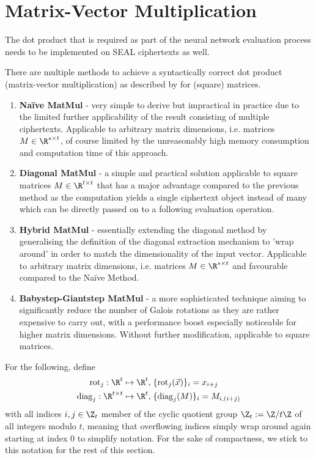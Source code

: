 \section{Matrix-Vector Multiplication}
The dot product that is required as part of the neural network evaluation process
needs to be implemented on SEAL ciphertexts as well.

There are multiple methods to achieve a syntactically correct dot product (matrix-vector multiplication)
as described by \textcite{2018-gazelle} for (square) matrices.

\begin{enumerate}
  \item \textbf{Naïve MatMul} - very simple to derive but impractical in practice due to the limited further
        applicability of the result consisting of multiple ciphertexts. Applicable to arbitrary matrix dimensions,
        i.e. matrices $M \in \R^{s \times t}$, of course limited by the unreasonably high memory consumption
        and computation time of this approach.
  \item \textbf{Diagonal MatMul} - a simple and practical solution applicable to square matrices $M \in \R^{t \times t}$
        that has a major advantage compared to the previous method as the computation yields a
        single ciphertext object instead of many which can be directly passed on to a following evaluation operation.
  \item \textbf{Hybrid MatMul} - essentially extending the diagonal method by generalising the definition of the
        diagonal extraction mechanism to 'wrap around' in order to match the dimensionality of the input vector.
        Applicable to arbitrary matrix dimensions, i.e. matrices $M \in \R^{s \times t}$ and favourable compared
        to the Naïve Method.
  \item \textbf{Babystep-Giantstep MatMul} - a more sophisticated technique aiming to significantly reduce the number of
        Galois rotations as they are rather expensive to carry out,
        with a performance boost especially noticeable for higher matrix dimensions.
        Without further modification, applicable to square matrices.
\end{enumerate}

For the following, define
\newcommand{\rot}{\mathrm{rot}}
\newcommand{\diag}{\mathrm{diag}}
\begin{align}
  \rot_j: \R^t \mapsto \R^t,             & \; \{\rot_j(\vec{x})\}_i = x_{i + j} \label{eq:rot-definition} \\
  \diag_j: \R^{t \times t} \mapsto \R^t, & \; \{\diag_j(M)\}_i = M_{i, (i+j)} \label{eq:diag-definition}
\end{align}
with all indices $i, j \in \Z_t$ member of the cyclic quotient group $\Z_t := \Z / t \Z$ of all integers
modulo $t$, meaning that overflowing indices simply wrap around again starting at index $0$ to simplify notation.
For the sake of compactness, we stick to this notation for the rest of this section.

